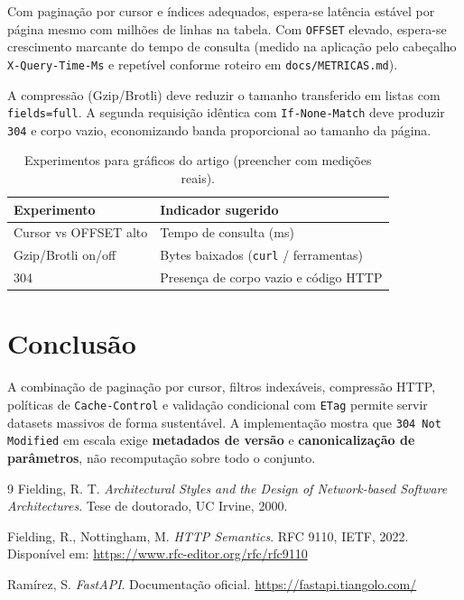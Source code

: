 \documentclass[12pt,a4paper]{article}
\begin{document}
Com paginação por cursor e índices adequados, espera-se latência estável por página mesmo com milhões de linhas na tabela. Com \texttt{OFFSET} elevado, espera-se crescimento marcante do tempo de consulta (medido na aplicação pelo cabeçalho \texttt{X-Query-Time-Ms} e repetível conforme roteiro em \texttt{docs/METRICAS.md}).

A compressão (Gzip/Brotli) deve reduzir o tamanho transferido em listas com \texttt{fields=full}. A segunda requisição idêntica com \texttt{If-None-Match} deve produzir \texttt{304} e corpo vazio, economizando banda proporcional ao tamanho da página.

\begin{table}[h]
\centering
\begin{tabular}{@{}ll@{}}
\toprule
Experimento & Indicador sugerido \\
\midrule
Cursor vs OFFSET alto & Tempo de consulta (ms) \\
Gzip/Brotli on/off & Bytes baixados (\texttt{curl} / ferramentas) \\
304 & Presença de corpo vazio e código HTTP \\
\bottomrule
\end{tabular}
\caption{Experimentos para gráficos do artigo (preencher com medições reais).}
\end{table}

\section{Conclusão}

A combinação de paginação por cursor, filtros indexáveis, compressão HTTP, políticas de \texttt{Cache-Control} e validação condicional com \texttt{ETag} permite servir datasets massivos de forma sustentável. A implementação mostra que \texttt{304 Not Modified} em escala exige \textbf{metadados de versão} e \textbf{canonicalização de parâmetros}, não recomputação sobre todo o conjunto.

\begin{thebibliography}{9}
Fielding, R. T. \emph{Architectural Styles and the Design of Network-based Software Architectures}. Tese de doutorado, UC Irvine, 2000.

Fielding, R., Nottingham, M. \emph{HTTP Semantics}. RFC 9110, IETF, 2022. Disponível em: \url{https://www.rfc-editor.org/rfc/rfc9110}

Ramírez, S. \emph{FastAPI}. Documentação oficial. \url{https://fastapi.tiangolo.com/}
\end{thebibliography}
\end{document}
